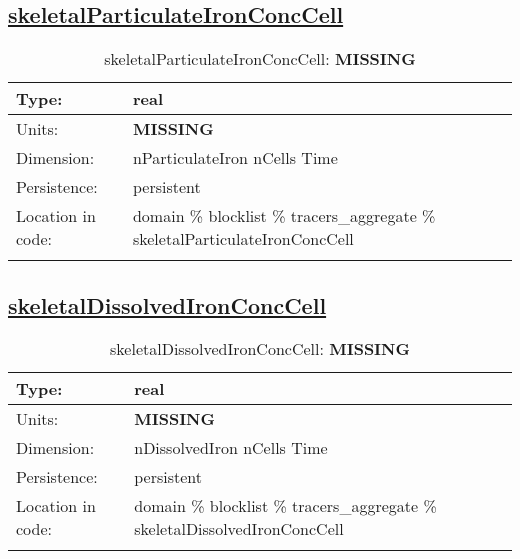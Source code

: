 \subsection[skeletalParticulateIronConcCell]{\hyperref[sec:var_tab_tracers_aggregate]{skeletalParticulateIronConcCell}}
\label{subsec:var_sec_tracers_aggregate_skeletalParticulateIronConcCell}
\begin{center}
\begin{longtable}{| p{2.0in} | p{4.0in} |}
        \hline 
        Type: & real \\
        \hline 
        Units: & {\bf \color{red} MISSING} \\
        \hline 
        Dimension: & nParticulateIron nCells Time \\
        \hline 
        Persistence: & persistent \\
        \hline 
         Location in code: & domain \% blocklist \% tracers\_aggregate \% skeletalParticulateIronConcCell \\
         \hline 
    \caption{skeletalParticulateIronConcCell: {\bf \color{red} MISSING}}
\end{longtable}
\end{center}
\subsection[skeletalDissolvedIronConcCell]{\hyperref[sec:var_tab_tracers_aggregate]{skeletalDissolvedIronConcCell}}
\label{subsec:var_sec_tracers_aggregate_skeletalDissolvedIronConcCell}
\begin{center}
\begin{longtable}{| p{2.0in} | p{4.0in} |}
        \hline 
        Type: & real \\
        \hline 
        Units: & {\bf \color{red} MISSING} \\
        \hline 
        Dimension: & nDissolvedIron nCells Time \\
        \hline 
        Persistence: & persistent \\
        \hline 
         Location in code: & domain \% blocklist \% tracers\_aggregate \% skeletalDissolvedIronConcCell \\
         \hline 
    \caption{skeletalDissolvedIronConcCell: {\bf \color{red} MISSING}}
\end{longtable}
\end{center}
